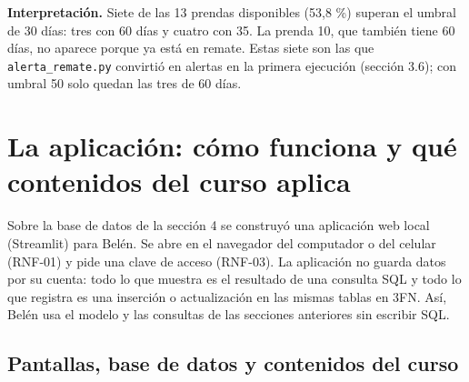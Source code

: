 \documentclass[11pt,letterpaper]{article}
\begin{document}
\textbf{Interpretación.} Siete de las 13 prendas disponibles (53,8 \%) superan el umbral de 30 días: tres con 60 días y cuatro con 35. La prenda 10, que también tiene 60 días, no aparece porque ya está en remate. Estas siete son las que \texttt{alerta\_\allowbreak{}remate.py} convirtió en alertas en la primera ejecución (sección 3.6); con umbral 50 solo quedan las tres de 60 días.

\section{La aplicación: cómo funciona y qué contenidos del curso aplica}

Sobre la base de datos de la sección 4 se construyó una aplicación web local (Streamlit) para Belén. Se abre en el navegador del computador o del celular (RNF-01) y pide una clave de acceso (RNF-03). La aplicación no guarda datos por su cuenta: todo lo que muestra es el resultado de una consulta SQL y todo lo que registra es una inserción o actualización en las mismas tablas en 3FN. Así, Belén usa el modelo y las consultas de las secciones anteriores sin escribir SQL.

\subsection{Pantallas, base de datos y contenidos del curso}
\end{document}

